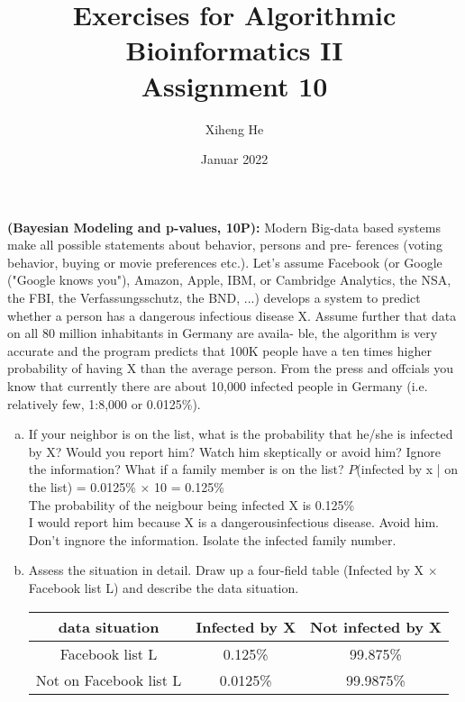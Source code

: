 \documentclass{article}
\title{Exercises for Algorithmic Bioinformatics II\\
Assignment 10}
\author{Xiheng He}
\date{Januar 2022}
\begin{document}
{\let\newpage\relax\maketitle}
\begin{flushleft}
\textbf{(Bayesian Modeling and p-values, 10P):}
\newline
Modern Big-data based systems make all possible statements about behavior, persons and pre-
ferences (voting behavior, buying or movie preferences etc.). Let's assume Facebook (or Google
("Google knows you"), Amazon, Apple, IBM, or Cambridge Analytics, the NSA, the FBI, the
Verfassungsschutz, the BND, ...) develops a system to predict whether a person has a dangerous
infectious disease X. Assume further that data on all 80 million inhabitants in Germany are availa-
ble, the algorithm is very accurate and the program predicts that 100K people have a ten times
higher probability of having X than the average person. From the press and offcials you know
that currently there are about 10,000 infected people in Germany (i.e. relatively few, 1:8,000 or
0.0125\%).
\begin{enumerate}[(a)]
    \item If your neighbor is on the list, what is the probability that he/she is infected by X? Would you
    report him? Watch him skeptically or avoid him? Ignore the information? What if a family
    member is on the list?
    \newline
    $P$(infected by x | on the list) = 0.0125\% $\times$ 10 = 0.125\% \\
    The probability of the neigbour being infected X is 0.125\% \\
    I would report him because X is a dangerousinfectious disease.
    Avoid him. Don't ingnore the information. Isolate the infected family number.
    \item Assess the situation in detail. Draw up a four-field table (Infected by X $\times$ Facebook list L)
    and describe the data situation.
    \newline
    \begin{tabular}{c|c|c}
        \hline
        data situation & Infected by X & Not infected by X \\
        \hline
        Facebook list L & 0.125\% & 99.875\% \\
        \hline
        Not on Facebook list L& 0.0125\% & 99.9875\% \\
    \end{tabular}

\end{enumerate}
\end{flushleft}
\end{document}
